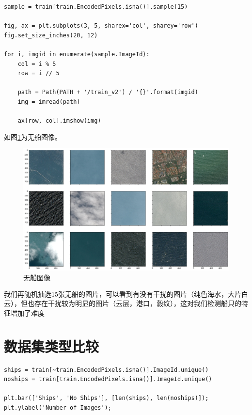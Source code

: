 \begin{lstlisting}
sample = train[train.EncodedPixels.isna()].sample(15)

fig, ax = plt.subplots(3, 5, sharex='col', sharey='row')
fig.set_size_inches(20, 12)

for i, imgid in enumerate(sample.ImageId):
    col = i % 5
    row = i // 5
    
    path = Path(PATH + '/train_v2') / '{}'.format(imgid)
    img = imread(path)
    
    ax[row, col].imshow(img)
\end{lstlisting}

如图\ref{fig::EDA7}为无船图像。

\begin{figure}[htbp]
\centering
\includegraphics[width=1\linewidth]{body/EDA_pic/EDA_12_0}
\caption{无船图像}
\label{fig::EDA7}
\end{figure}

我们再随机抽选15张无船的图片，可以看到有没有干扰的图片（纯色海水，大片白云），但也存在干扰较为明显的图片（云层，港口，縠纹），这对我们检测船只的特征增加了难度

\section{数据集类型比较}\label{ux6570ux636eux96c6ux7c7bux578bux6bd4ux8f83}

\begin{lstlisting}
ships = train[~train.EncodedPixels.isna()].ImageId.unique()
noships = train[train.EncodedPixels.isna()].ImageId.unique()

plt.bar(['Ships', 'No Ships'], [len(ships), len(noships)]);
plt.ylabel('Number of Images');
\end{lstlisting}

